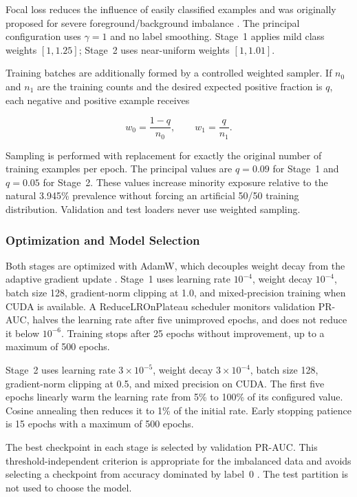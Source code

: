 Focal loss reduces the influence of easily classified examples and was
originally proposed for severe foreground/background imbalance
\cite{Lin2017FocalLoss}. The principal configuration uses $\gamma=1$ and no
label smoothing. Stage~1 applies mild class weights $[1,1.25]$; Stage~2 uses
near-uniform weights $[1,1.01]$.

Training batches are additionally formed by a controlled weighted sampler. If
$n_0$ and $n_1$ are the training counts and the desired expected positive
fraction is $q$, each negative and positive example receives

\begin{equation}
    w_0=\frac{1-q}{n_0},
    \qquad
    w_1=\frac{q}{n_1}.
    \label{eq:controlled_sampler}
\end{equation}

Sampling is performed with replacement for exactly the original number of
training examples per epoch. The principal values are $q=0.09$ for Stage~1 and
$q=0.05$ for Stage~2. These values increase minority exposure relative to the
natural 3.945\% prevalence without forcing an artificial 50/50 training
distribution. Validation and test loaders never use weighted sampling.

\subsubsection{Optimization and Model Selection}
\label{subsubsec:optimization}

Both stages are optimized with AdamW, which decouples weight decay from the
adaptive gradient update \cite{Loshchilov2019AdamW}. Stage~1 uses learning rate
$10^{-4}$, weight decay $10^{-4}$, batch size 128, gradient-norm clipping at
1.0, and mixed-precision training when CUDA is available. A
ReduceLROnPlateau scheduler monitors validation PR-AUC, halves the learning rate
after five unimproved epochs, and does not reduce it below $10^{-6}$. Training
stops after 25 epochs without improvement, up to a maximum of 500 epochs.

Stage~2 uses learning rate $3\times10^{-5}$, weight decay
$3\times10^{-4}$, batch size 128, gradient-norm clipping at 0.5, and mixed
precision on CUDA. The first five epochs linearly warm the learning rate from
5\% to 100\% of its configured value. Cosine annealing then reduces it to 1\%
of the initial rate. Early stopping patience is 15 epochs with a maximum of 500
epochs.

The best checkpoint in each stage is selected by validation PR-AUC. This
threshold-independent criterion is appropriate for the imbalanced data and
avoids selecting a checkpoint from accuracy dominated by label~0
\cite{SaitoRehmsmeier2015}. The test partition is not used to choose the model.

